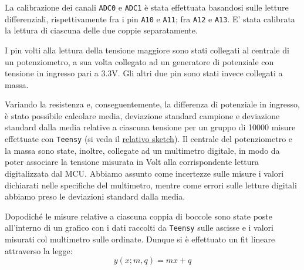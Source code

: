 \documentclass{article}[a4paper, oneside, 11pt]
\begin{document}
La calibrazione dei canali \verb+ADC0+ e \verb+ADC1+ è stata effettuata
basandosi sulle letture differenziali, rispettivamente fra i pin \verb+A10+
e \verb+A11+; fra \verb+A12+ e \verb+A13+. E’ stata calibrata la lettura
di ciascuna delle due coppie separatamente.

I pin volti alla lettura della tensione maggiore sono stati collegati al 
centrale di un potenziometro, a sua volta collegato ad un generatore di 
potenziale con tensione in ingresso pari a $3.3\si{\V}$. Gli altri due pin
sono stati invece collegati a massa.

Variando la resistenza e, conseguentemente, la differenza di potenziale in 
ingresso, è stato possibile calcolare media, deviazione standard campione
e deviazione standard dalla media relative a ciascuna tensione per 
un gruppo di 10000 misure effettuate con \verb+Teensy+ (si veda il 
\href{https://github.com/LucaCiucci/relaz_seme/blob/master/sketches/teensy_calib/teensy_calib.ino}{relativo sketch}).
Il centrale del potenziometro e la massa sono state, inoltre, collegate ad un
multimetro digitale, in modo da poter associare la tensione misurata in
Volt alla corrispondente lettura digitalizzata dal MCU. Abbiamo assunto come
incertezze sulle misure i valori dichiarati nelle specifiche del multimetro,
mentre come errori sulle letture digitali abbiamo preso le deviazioni standard
dalla media.

Dopodiché le misure relative a ciascuna coppia di boccole sono state poste 
all’interno di un grafico con i dati raccolti da \verb+Teensy+ sulle ascisse
e i valori misurati col multimetro sulle ordinate. Dunque si è effettuato un
fit lineare attraverso la legge:
\begin{equation}
y(x; m, q)  = m x + q
\end{equation}
\end{document}
